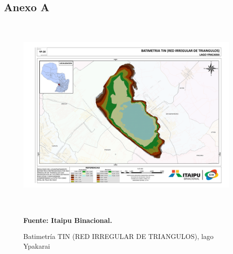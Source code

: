 \appendixpageoff
\begin{appendices}




\chapter*{Anexo A}

\begin{figure}[H]
    \centering
    \includegraphics[width=150mm, height=100mm]{Imagenes/cap3/Batimetria_lago_Ypacarai_TIN_A3.pdf}
    \caption[BATIMETRIA TIN lago Ypakarai]{Batimetr\'ia TIN (RED IRREGULAR DE TRIANGULOS), lago Ypakarai} \textbf{Fuente:  Itaipu Binacional.}
    \label{fig:BatimetriaItaipu}
\end{figure}


\end{appendices}
